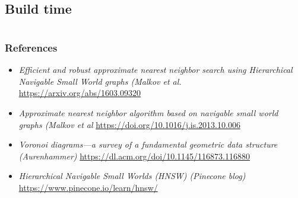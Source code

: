 \documentclass{beamer}
\begin{document}
\subsection{Build time}

\section{}
  \begin{frame}
    \frametitle{References}  
    \small
    \begin{itemize}
	\item \textit{Efficient and robust approximate nearest neighbor search using Hierarchical Navigable Small World graphs (Malkov et al.} \url{https://arxiv.org/abs/1603.09320}    

	\item \textit{Approximate nearest neighbor algorithm based on navigable small world graphs (Malkov et al} \url{https://doi.org/10.1016/j.is.2013.10.006}	
	\item \textit{Voronoi diagrams—a survey of a fundamental geometric data structure (Aurenhammer)} \url{https://dl.acm.org/doi/10.1145/116873.116880}
	\item \textit{Hierarchical Navigable Small Worlds (HNSW) (Pinecone blog)} \url{https://www.pinecone.io/learn/hnsw/}
	\end{itemize}
	
  \end{frame}
\end{document}
